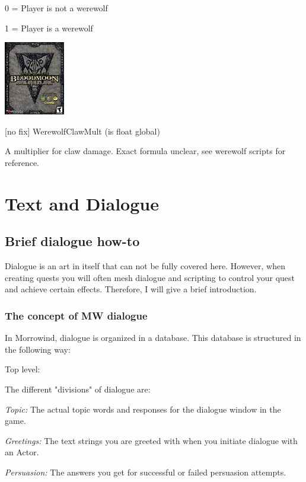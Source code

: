 0 = Player is not a werewolf

1 = Player is a werewolf

\includegraphics{media/image7.png}

{[}no fix{]} WerewolfClawMult (is float global)

A multiplier for claw damage. Exact formula unclear, see werewolf
scripts for reference.

\hypertarget{text-and-dialogue}{%
\section{\texorpdfstring{\hfill\break
Text and Dialogue}{ Text and Dialogue}}\label{text-and-dialogue}}

\hypertarget{brief-dialogue-how-to}{%
\subsection{Brief dialogue how-to}\label{brief-dialogue-how-to}}

Dialogue is an art in itself that can not be fully covered here.
However, when creating quests you will often mesh dialogue and scripting
to control your quest and achieve certain effects. Therefore, I will
give a brief introduction.

\hypertarget{the-concept-of-mw-dialogue}{%
\subsubsection{The concept of MW
dialogue}\label{the-concept-of-mw-dialogue}}

In Morrowind, dialogue is organized in a database. This database is
structured in the following way:

Top level:

The different "divisions" of dialogue are:

\emph{Topic:} The actual topic words and responses for the dialogue
window in the game.

\emph{Greetings:} The text strings you are greeted with when you
initiate dialogue with an Actor.

\emph{Persuasion:} The answers you get for successful or failed
persuasion attempts.

